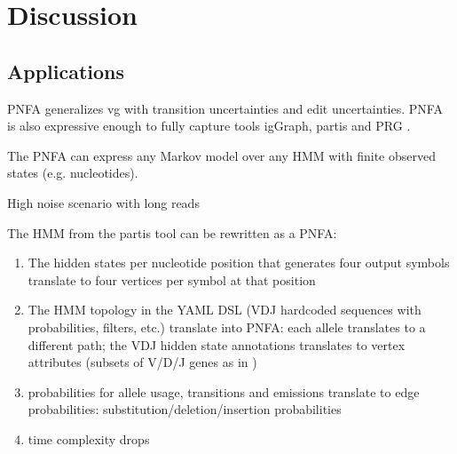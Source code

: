 \section{Discussion}

\subsection{Applications}
PNFA generalizes vg with transition uncertainties and edit uncertainties. PNFA is also expressive enough to fully capture tools igGraph\cite{bonissone2015immunoglobulin}, partis \cite{ralph2016consistency} and PRG \cite{dilthey2015improved}.

The PNFA can express any Markov model over any HMM with finite observed states (e.g. nucleotides).

High noise scenario with long reads 

The HMM from the partis tool \cite{ralph2016consistency} can be rewritten as a PNFA:
\begin{enumerate}
	\item The hidden states per nucleotide position that generates four output symbols translate to four vertices per symbol at that position
	\item The HMM topology in the YAML DSL (VDJ hardcoded sequences with probabilities, filters, etc.) translate into PNFA: each allele translates to a different path; the VDJ hidden state annotations translates to vertex attributes (subsets of V/D/J genes as in \cite{bonissone2015immunoglobulin})
	\item probabilities for allele usage, transitions and emissions translate to edge probabilities: substitution/deletion/insertion probabilities
	\item time complexity drops
\end{enumerate}

